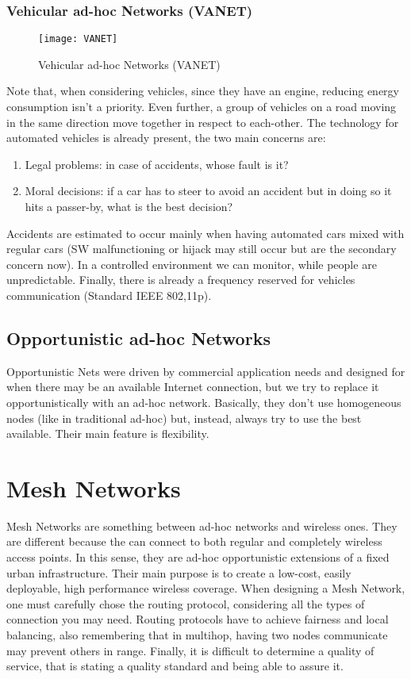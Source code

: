 \subsubsection{Vehicular ad-hoc Networks (VANET)}	

\begin{figure}[t]
  \centering
  \texttt{[image: VANET]}
  \caption{Vehicular ad-hoc Networks (VANET)}
  \label{fig:mn:VANET}
\end{figure}

Note that, when considering vehicles, since they have an engine, 
reducing energy consumption isn't a priority. Even further, a group of vehicles 
on a road moving in the same direction move together in respect to each-other. 
The technology for automated vehicles is already present, the two main concerns 
are:
\begin{enumerate}
\item Legal problems: in case of accidents, whose fault is it?
\item Moral decisions: if a car has to steer to avoid an 
  accident but in doing so it hits a passer-by, what is the best decision?
\end{enumerate}
Accidents are estimated to occur mainly when having automated cars mixed 
with regular cars (SW malfunctioning or hijack may still occur but are the 
secondary concern now). In a controlled environment we can monitor, while people 
are unpredictable. 
Finally, there is already a frequency reserved for vehicles 
communication (Standard IEEE 802,11p).

\subsection{Opportunistic ad-hoc Networks}
Opportunistic Nets were driven by commercial application needs and 
designed for when there may be an available Internet connection, but we try to 
replace it opportunistically with an ad-hoc network. Basically, they don't use 
homogeneous nodes (like in traditional ad-hoc) but, instead, always try to use 
the best available. Their main feature is flexibility.

\section{Mesh Networks}
Mesh Networks are something between ad-hoc networks and wireless ones. 
They are different because the can connect to both regular and completely 
wireless access points. In this sense, they are ad-hoc opportunistic extensions 
of a fixed urban infrastructure.
Their main purpose is to create a low-cost, easily deployable, high 
performance wireless coverage. When designing a Mesh Network, one must carefully 
chose the routing protocol, considering all the types of connection you may 
need. Routing protocols have to achieve fairness and local balancing, also 
remembering that in multihop, having two nodes communicate may prevent others in 
range.
Finally, it is difficult to determine a quality of service, that is 
stating a quality standard and being able to assure it.

